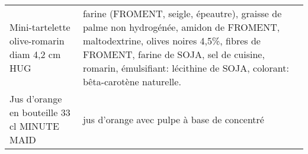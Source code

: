 \begin{longtable}{p{5cm}p{10cm}}
                                                            Mini-tartelette olive-romarin diam 4,2 cm HUG &                                                                                                                                                                                                                                                                                                                                                                                                                                                                                                                                                                                                                                                                                                                                                                                farine (FROMENT, seigle, épeautre), graisse de palme non hydrogénée, amidon de FROMENT, maltodextrine, olives noires 4,5\%, fibres de FROMENT, farine de SOJA, sel de cuisine, romarin, émulsifiant: lécithine de SOJA, colorant: bêta-carotène naturelle. \\
                                                              Jus d'orange en bouteille 33 cl MINUTE MAID &                                                                                                                                                                                                                                                                                                                                                                                                                                                                                                                                                                                                                                                                                                                                                                                                                                                                                                                                                                                              jus d'orange avec pulpe à base de concentré \\

\end{longtable}
